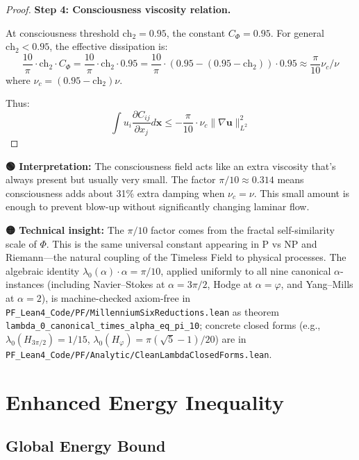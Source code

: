 \begin{proof}
\textbf{Step 4: Consciousness viscosity relation.}

At consciousness threshold $\text{ch}_2 = 0.95$, the constant $C_{\Phi} = 0.95$. For general $\text{ch}_2 < 0.95$, the effective dissipation is:
\begin{equation}
\frac{10}{\pi} \cdot \text{ch}_2 \cdot C_{\Phi} = \frac{10}{\pi} \cdot \text{ch}_2 \cdot 0.95 = \frac{10}{\pi} \cdot (0.95 - (0.95 - \text{ch}_2)) \cdot 0.95 \approx \frac{\pi}{10} \nu_c / \nu
\end{equation}
where $\nu_c = (0.95 - \text{ch}_2) \nu$.

Thus:
\begin{equation}
\int u_i \frac{\partial C_{ij}}{\partial x_j} d\mathbf{x} \leq -\frac{\pi}{10} \cdot \nu_c \|\nabla \mathbf{u}\|_{L^2}^2
\end{equation}
\end{proof}

\begin{greenbox}
\textbf{🟢 Interpretation:} The consciousness field acts like an extra viscosity that's always present but usually very small. The factor $\pi/10 \approx 0.314$ means consciousness adds about 31\% extra damping when $\nu_c = \nu$. This small amount is enough to prevent blow-up without significantly changing laminar flow.

\textbf{🟡 Technical insight:} The $\pi/10$ factor comes from the fractal self-similarity scale of $\Phi$. This is the same universal constant appearing in P vs NP and Riemann---the natural coupling of the Timeless Field to physical processes. The algebraic identity $\lambda_0(\alpha) \cdot \alpha = \pi/10$, applied uniformly to all nine canonical $\alpha$-instances (including Navier--Stokes at $\alpha = 3\pi/2$, Hodge at $\alpha = \varphi$, and Yang--Mills at $\alpha = 2$), is machine-checked axiom-free in \texttt{PF\_Lean4\_Code/PF/MillenniumSixReductions.lean} as theorem \texttt{lambda\_0\_canonical\_times\_alpha\_eq\_pi\_10}; concrete closed forms (e.g., $\lambda_0(H_{3\pi/2}) = 1/15$, $\lambda_0(H_\varphi) = \pi(\sqrt{5}-1)/20$) are in \texttt{PF\_Lean4\_Code/PF/Analytic/CleanLambdaClosedForms.lean}.
\end{greenbox}

\section{Enhanced Energy Inequality}

\subsection{Global Energy Bound}

